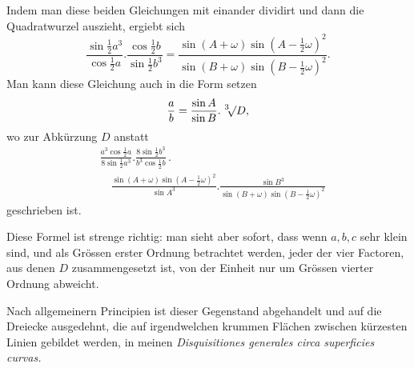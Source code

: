 \noindent Indem man diese beiden Gleichungen mit einander dividirt und dann die Quadratwurzel auszieht, ergiebt sich
\[
\frac{\sin\tfrac12 a^3}{\cos\tfrac12 a}.\frac{\cos\tfrac12 b}{\sin\tfrac12 b^3}
=\frac{\sin(A+\omega)\sin(A-\tfrac12\omega)^2}{\sin(B+\omega)\sin(B-\tfrac12\omega)^2}.
\]
\noindent Man kann diese Gleichung auch in die Form setzen
\[
\frac ab=\frac{\sin A}{\sin B}.\mkern6mu{}^3\mkern-4mu\mathord{\surd}D,
\]
\noindent wo zur Abkürzung $D$ anstatt
\[
\begin{aligned}
&\frac{a^3\cos\tfrac12 a}{8\sin\tfrac12 a^3}.\frac{8\sin\tfrac12 b^3}{b^3\cos\tfrac12 b}\, .\\[5pt]
&\quad\frac{\sin(A+\omega)\sin(A-\tfrac12\omega)^2}{\sin A^3}.\frac{\sin B^3}{\sin(B+\omega)\sin(B-\tfrac12\omega)^2}
\end{aligned}
\]
\noindent geschrieben ist.

Diese Formel ist strenge richtig: man sieht aber sofort, dass wenn $a,b,c$ sehr klein sind, und als Grössen erster Ordnung betrachtet werden, jeder der vier Factoren, aus denen $D$ zusammengesetzt ist, von der Einheit nur um Grössen vierter Ordnung abweicht.

Nach allgemeinern Principien ist dieser Gegenstand abgehandelt und auf die Dreiecke ausgedehnt, die auf irgendwelchen krummen Flächen zwischen kürzesten Linien gebildet werden, in meinen \textit{Disquisitiones generales circa superficies curvas.}

